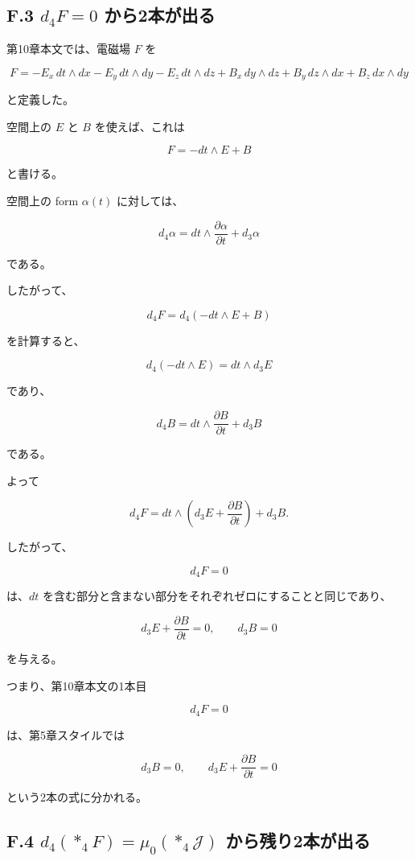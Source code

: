 \documentclass[a4paper,12pt,openany]{book}
\begin{document}
\hypertarget{f.3-d_4f0-ux304bux30892ux672cux304cux51faux308b}{%
\subsection*{\texorpdfstring{F.3 \(d_4F=0\)
から2本が出る}{F.3 d\_4F=0 から2本が出る}}\label{f.3-d_4f0-ux304bux30892ux672cux304cux51faux308b}}

第10章本文では、電磁場 \(F\) を

\[
F=-E_x\,dt\wedge dx-E_y\,dt\wedge dy-E_z\,dt\wedge dz+B_x\,dy\wedge dz+B_y\,dz\wedge dx+B_z\,dx\wedge dy
\]

と定義した。

空間上の \(E\) と \(B\) を使えば、これは

\[
F=-dt\wedge E+B
\]

と書ける。

空間上の form \(\alpha(t)\) に対しては、

\[
d_4\alpha = dt\wedge\frac{\partial\alpha}{\partial t}+d_3\alpha
\]

である。

したがって、

\[
d_4F=d_4(-dt\wedge E+B)
\]

を計算すると、

\[
d_4(-dt\wedge E)=dt\wedge d_3E
\]

であり、

\[
d_4B=dt\wedge\frac{\partial B}{\partial t}+d_3B
\]

である。

よって

\[
d_4F=dt\wedge\left(d_3E+\frac{\partial B}{\partial t}\right)+d_3B.
\]

したがって、

\[
d_4F=0
\]

は、\(dt\)
を含む部分と含まない部分をそれぞれゼロにすることと同じであり、

\[
d_3E+\frac{\partial B}{\partial t}=0,
\qquad
d_3B=0
\]

を与える。

つまり、第10章本文の1本目

\[
d_4F=0
\]

は、第5章スタイルでは

\[
d_3B=0,
\qquad
d_3E+\frac{\partial B}{\partial t}=0
\]

という2本の式に分かれる。

\hypertarget{f.4-d_4ast_4fmu_0ast_4mathcal-j-ux304bux3089ux6b8bux308a2ux672cux304cux51faux308b}{%
\subsection*{\texorpdfstring{F.4 \(d_4(\ast_4F)=\mu_0(\ast_4\mathcal J)\)
から残り2本が出る}{F.4 d\_4(\textbackslash ast\_4F)=\textbackslash mu\_0(\textbackslash ast\_4\textbackslash mathcal J) から残り2本が出る}}\label{f.4-d_4ast_4fmu_0ast_4mathcal-j-ux304bux3089ux6b8bux308a2ux672cux304cux51faux308b}}
\end{document}
